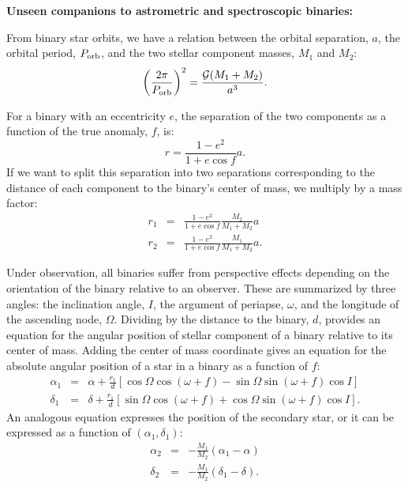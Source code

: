 \documentclass[12pt,preprint]{hackaastex}
\newcommand{\Porb}{\ifmmode {P_{\rm orb}}\else${P_{\rm orb}}$\fi}
\begin{document}
\begin{center}
{\large \textbf{\sc Unseen companions to astrometric and spectroscopic binaries:}}
\end{center}
\normalsize

\vspace{-0.1in}



From binary star orbits, we have a relation between the orbital separation, $a$, the orbital period, \Porb, and the two stellar component masses, $M_1$ and $M_2$:
\begin{equation}
\left( \frac{2 \pi}{\Porb} \right)^2 = \frac{\mathcal{G} (M_1 + M_2) }{a^3}.
\end{equation}

For a binary with an eccentricity $e$, the separation of the two components as a function of the true anomaly, $f$, is:
\begin{equation}
r = \frac{1-e^2}{1+e \cos f} a.
\end{equation} 
If we want to split this separation into two separations corresponding to the distance of each component to the binary's center of mass, we multiply by a mass factor:
\begin{eqnarray}
r_1 &=& \frac{1-e^2}{1+e \cos f} \frac{M_2}{M_1+M_2} a \nonumber \\
r_2 &=& \frac{1-e^2}{1+e \cos f} \frac{M_1}{M_1+M_2} a.
\end{eqnarray}


Under observation, all binaries suffer from perspective effects depending on the orientation of the binary relative to an observer. These are summarized by three angles: the inclination angle, $I$, the argument of periapse, $\omega$, and the longitude of the ascending node, $\Omega$. Dividing by the distance to the binary, $d$, provides an equation for the angular position of stellar component of a binary relative to its center of mass. Adding the center of mass coordinate gives an equation for the absolute angular position of a star in a binary as a function of $f$:
\begin{eqnarray}
\alpha_1 &=& \alpha + \frac{r_1}{d} \left[ \cos \Omega \cos (\omega+f) - \sin \Omega \sin(\omega+f) \cos I \right] \nonumber \\
\delta_1 &=& \delta + \frac{r_1}{d} \left[ \sin \Omega \cos (\omega+f) + \cos \Omega \sin(\omega+f) \cos I \right].
\end{eqnarray}
An analogous equation expresses the position of the secondary star, or it can be expressed as a function of $(\alpha_1, \delta_1)$:
\begin{eqnarray}
\alpha_2 &=& -\frac{M_1}{M_2}(\alpha_1 - \alpha) \nonumber \\
\delta_2 &=& -\frac{M_1}{M_2}(\delta_1 - \delta).
\end{eqnarray}
\end{document}
